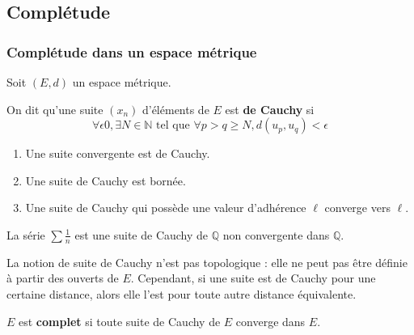 




	\subsection{Complétude}

	\subsubsection{Complétude dans un espace métrique}


	Soit $(E,d)$ un espace métrique.

	\begin{definition}
		On dit qu'une suite $(x_n)$ d'éléments de $E$ est \textbf{de Cauchy} si
		\[ \forall \epsilon 0, \exists N \in \mathbb{N} \text{ tel que } \forall p > q \geq N, d(u_p, u_q) < \epsilon \]
	\end{definition}

	\begin{proposition}
		\begin{enumerate}[label=(\roman*)]
			\item Une suite convergente est de Cauchy.
			\item Une suite de Cauchy est bornée.
			\item Une suite de Cauchy qui possède une valeur d'adhérence $\ell$ converge vers $\ell$.
		\end{enumerate}
	\end{proposition}


	\begin{cexample}
		La série $\sum \frac{1}{n}$ est une suite de Cauchy de $\mathbb{Q}$ non convergente dans $\mathbb{Q}$.
	\end{cexample}


	\begin{remark}
		La notion de suite de Cauchy n'est pas topologique : elle ne peut pas être définie à partir des ouverts de $E$. Cependant, si une suite est de Cauchy pour une certaine distance, alors elle l'est pour toute autre distance équivalente.
	\end{remark}

	\begin{definition}
		$E$ est \textbf{complet} si toute suite de Cauchy de $E$ converge dans $E$.
	\end{definition}

